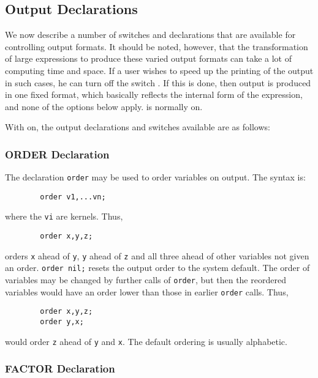 \subsection{Output Declarations}
\hypertarget{switch:PRI}{}

We now describe a number of switches and declarations that are available
for controlling output formats. It should be noted, however, that the
transformation of large expressions to produce these varied output formats
can take a lot of computing time and space. If a user wishes to speed up
the printing of the output in such cases, he can turn off the switch
. If this is done, then output is produced in one fixed
format, which basically reflects the internal form of the expression, and
none of the options below apply.  is normally on.

With  on, the output declarations
and switches available are as follows:

\subsubsection{ORDER Declaration}
\hypertarget{command:ORDER}{}

The declaration \texttt{order}
may be used to order variables on output.  The syntax is:
\begin{verbatim}
        order v1,...vn;
\end{verbatim}
where the \texttt{vi} are kernels.  Thus,
\begin{verbatim}
        order x,y,z;
\end{verbatim}
orders \texttt{x} ahead of \texttt{y}, \texttt{y} ahead of \texttt{z} and all three
ahead of other variables not given an order. \texttt{order nil;} resets the
output order to the system default.  The order of variables may be changed
by further calls of \texttt{order}, but then the reordered variables would
have an order lower than those in earlier \texttt{order} calls.
Thus,
\begin{verbatim}
        order x,y,z;
        order y,x;
\end{verbatim}
would order \texttt{z} ahead of \texttt{y} and \texttt{x}.  The default ordering is
usually alphabetic.

\subsubsection{FACTOR Declaration}
\hypertarget{command:FACTOR}{}


